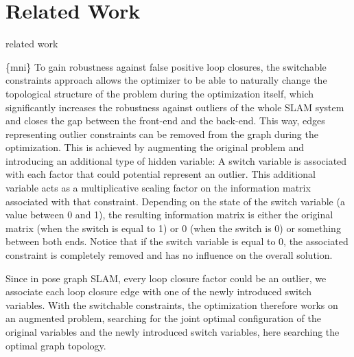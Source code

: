 \section{Related Work}
related work

\{mni\} To gain robustness against false positive loop closures, the switchable constraints approach allows the optimizer to be able to naturally change the topological structure of the problem during the optimization itself, which significantly increases the robustness against outliers of the whole SLAM system and closes the gap between the front-end and the back-end. This way, edges representing outlier constraints can be removed from the graph during the optimization. This is achieved by augmenting the original problem and introducing an additional type of hidden variable: A switch variable is associated with each factor that could potential represent an outlier. This additional variable acts as a multiplicative scaling factor on the information matrix associated with that constraint. Depending on the state of the switch variable (a value between 0 and 1), the resulting information matrix is either the original matrix (when the switch is equal to 1) or 0 (when the switch is 0) or something between both ends. Notice that if the switch variable is equal to 0, the associated constraint is completely removed and has no influence on the overall solution. 

Since in pose graph SLAM, every loop closure factor could be an outlier, we associate each loop closure edge with one of the newly introduced switch variables. With the switchable constraints, the optimization therefore works on an augmented problem, searching for the joint optimal configuration of the original variables and the newly introduced switch variables, here searching the optimal graph topology. 